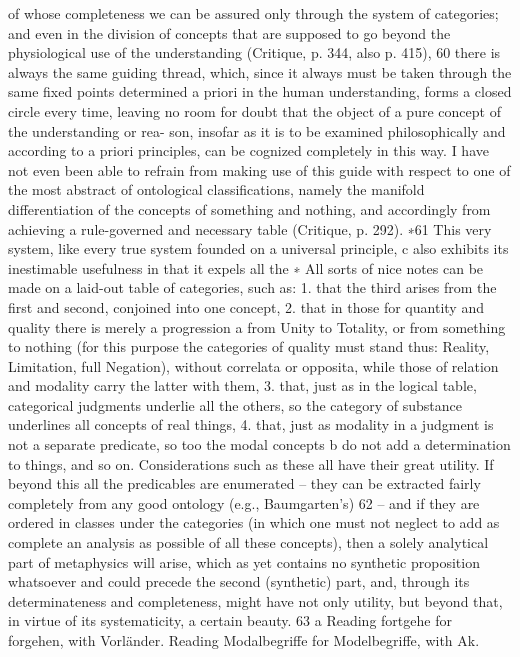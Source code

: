 of whose completeness we can be assured only through the system of
categories; and even in the division of concepts that are supposed to go
beyond the physiological use of the understanding (Critique, p. 344, also
p. 415), 60 there is always the same guiding thread, which, since it always
must be taken through the same ﬁxed points determined a priori in the
human understanding, forms a closed circle every time, leaving no room
for doubt that the object of a pure concept of the understanding or rea-
son, insofar as it is to be examined philosophically and according to a
priori principles, can be cognized completely in this way. I have not even
been able to refrain from making use of this guide with respect to one
of the most abstract of ontological classiﬁcations, namely the manifold
differentiation of the concepts of something and nothing, and accordingly
from achieving a rule-governed and necessary table (Critique, p. 292). ∗61
This very system, like every true system founded on a universal
principle, c also exhibits its inestimable usefulness in that it expels all the
∗ All sorts of nice notes can be made on a laid-out table of categories, such as:
1. that the third arises from the ﬁrst and second, conjoined into one concept,
2. that in those for quantity and quality there is merely a progression a from
Unity to Totality, or from something to nothing (for this purpose the categories
of quality must stand thus: Reality, Limitation, full Negation), without correlata
or opposita, while those of relation and modality carry the latter with them,
3. that, just as in the logical table, categorical judgments underlie all the others,
so the category of substance underlines all concepts of real things, 4. that,
just as modality in a judgment is not a separate predicate, so too the modal
concepts b do not add a determination to things, and so on. Considerations
such as these all have their great utility. If beyond this all the predicables are
enumerated – they can be extracted fairly completely from any good ontology
(e.g., Baumgarten’s) 62 – and if they are ordered in classes under the categories
(in which one must not neglect to add as complete an analysis as possible of all
these concepts), then a solely analytical part of metaphysics will arise, which
as yet contains no synthetic proposition whatsoever and could precede the
second (synthetic) part, and, through its determinateness and completeness,
might have not only utility, but beyond that, in virtue of its systematicity, a
certain beauty. 63
a Reading fortgehe for forgehen, with Vorländer.
Reading Modalbegriffe for Modelbegriffe, with Ak.
